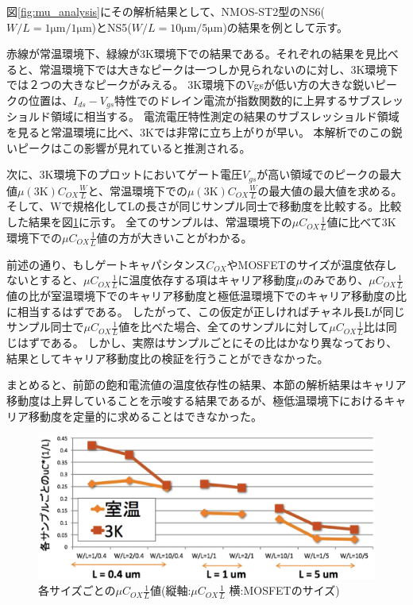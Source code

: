 			図\ref{fig:mu_analysis}にその解析結果として、NMOS-ST2型のNS6($W/L = 1\mathrm{\mu m}/1\mathrm{\mu m}$)とNS5($W/L = 10\mathrm{\mu m}/5\mathrm{\mu m}$)の結果を例として示す。
			
			赤線が常温環境下、緑線が3K環境下での結果である。それぞれの結果を見比べると、常温環境下では大きなピークは一つしか見られないのに対し、3K環境下では２つの大きなピークがみえる。
			3K環境下のVgsが低い方の大きな鋭いピークの位置は、$I_{ds}-V_{gs}$特性でのドレイン電流が指数関数的に上昇するサブスレッショルド領域に相当する。
			電流電圧特性測定の結果のサブスレッショルド領域を見ると常温環境に比べ、3Kでは非常に立ち上がりが早い。
			本解析でのこの鋭いピークはこの影響が見れていると推測される。
			
			次に、3K環境下のプロットにおいてゲート電圧$V_{gs}$が高い領域でのピークの最大値$\mu(\mathrm{3K}) C_{OX} \frac{W}{L}$と、常温環境下での$\mu(\mathrm{3K}) C_{OX} \frac{W}{L}$の最大値の最大値を求める。
			そして、Wで規格化してLの長さが同じサンプル同士で移動度を比較する。比較した結果を図\ref{fig:mu_analysis_size}に示す。
			全てのサンプルは、常温環境下の$\mu C_{OX} \frac{1}{L}$値に比べて3K環境下での$\mu C_{OX} \frac{1}{L}$値の方が大きいことがわかる。
			
			前述の通り、もしゲートキャパシタンス$C_{OX}$やMOSFETのサイズが温度依存しないとすると、$\mu C_{OX} \frac{1}{L}$に温度依存する項はキャリア移動度$\mu$のみであり、$\mu C_{OX} \frac{1}{L}$値の比が室温環境下でのキャリア移動度と極低温環境下でのキャリア移動度の比に相当するはずである。
			したがって、この仮定が正しければチャネル長Lが同じサンプル同士で$\mu C_{OX} \frac{1}{L}$値を比べた場合、全てのサンプルに対して$\mu C_{OX} \frac{1}{L}$比は同じはずである。
			しかし、実際はサンプルごとにその比はかなり異なっており、結果としてキャリア移動度比の検証を行うことができなかった。
			
			まとめると、前節の飽和電流値の温度依存性の結果、本節の解析結果はキャリア移動度は上昇していることを示唆する結果であるが、極低温環境下におけるキャリア移動度を定量的に求めることはできなかった。
			
			\begin{figure}[htbp]
				\begin{center}
					\includegraphics[clip,width=15.0cm]{./Chapter/Appendix/Picture/NST/mu_analysis/mu_analysis_size.eps}
					\caption{各サイズごとの$\mu C_{OX} \frac{1}{L}$値(縦軸:$\mu C_{OX} \frac{1}{L}$ 横:MOSFETのサイズ)}
					\label{fig:mu_analysis_size}
				\end{center}
			\end{figure}
			\clearpage
			
